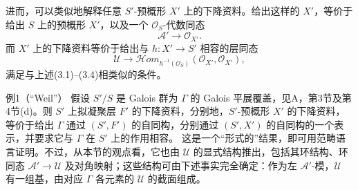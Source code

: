 进而，可以类似地解释任意 $S'$-预概形 $X'$ 上的下降资料。给出这样的 $X'$，等价于给出 $S$ 上的预概形 $X'$，以及一个 $\mathcal O_S$-代数同态
\[
\mathcal A'\longrightarrow\mathcal O_{X'}.
\]
而 $X'$ 上的下降资料等价于给出与 $h:X'\to S'$ 相容的层同态
\[
\mathcal U\longrightarrow
\mathcal H\!om_{h^{-1}(\mathcal O_S)}(\mathcal O_{X'},\mathcal O_{X'}),
\]
满足与上述(3.1)--(3.4)相类似的条件。
\begin{statement}{例1（“Weil”）}
假设 $S'/S$ 是 Galois 群为 $\Gamma$ 的 Galois 平展覆盖，见A，第3节及第4节(d)。则 $S'$ 上拟凝聚层 $F'$ 的下降资料，分别地，$S'$-预概形 $X'$ 的下降资料，等价于给出 $\Gamma$ 通过 $(S',F')$ 的自同构，分别通过 $(S',X')$ 的自同构的一个表示，并要求它与 $\Gamma$ 在 $S'$ 上的作用相容。
这是一个“形式的”结果，即可用范畴语言证明。不过，从本节的观点看，它也由 $\mathcal U$ 的显式结构推出，包括其环结构、环同态 $\mathcal A'\to\mathcal U$ 及对角映射；这些结构可由下述事实完全确定：作为左 $\mathcal A'$-模，$\mathcal U$ 有一组基，由对应 $\Gamma$ 各元素的 $\mathcal U$ 的截面组成。
\end{statement}

